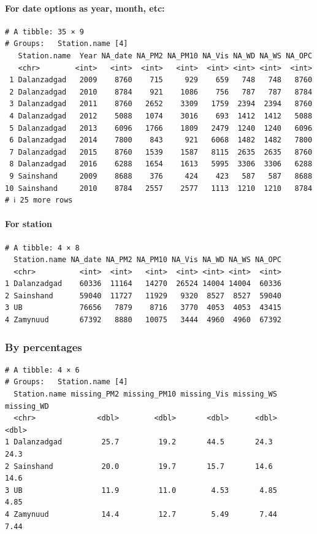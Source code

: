 \documentclass[
]{agujournal2019}
\let\oldparagraph\paragraph
\renewcommand{\paragraph}[1]{\oldparagraph{#1}\mbox{}}
\begin{document}
\paragraph{For date options as year, month,
etc:}\label{for-date-options-as-year-month-etc}

\begin{verbatim}
# A tibble: 35 × 9
# Groups:   Station.name [4]
   Station.name  Year NA_date NA_PM2 NA_PM10 NA_Vis NA_WD NA_WS NA_OPC
   <chr>        <int>   <int>  <int>   <int>  <int> <int> <int>  <int>
 1 Dalanzadgad   2009    8760    715     929    659   748   748   8760
 2 Dalanzadgad   2010    8784    921    1086    756   787   787   8784
 3 Dalanzadgad   2011    8760   2652    3309   1759  2394  2394   8760
 4 Dalanzadgad   2012    5088   1074    3016    693  1412  1412   5088
 5 Dalanzadgad   2013    6096   1766    1809   2479  1240  1240   6096
 6 Dalanzadgad   2014    7800    843     921   6068  1482  1482   7800
 7 Dalanzadgad   2015    8760   1539    1587   8115  2635  2635   8760
 8 Dalanzadgad   2016    6288   1654    1613   5995  3306  3306   6288
 9 Sainshand     2009    8688    376     424    423   587   587   8688
10 Sainshand     2010    8784   2557    2577   1113  1210  1210   8784
# ℹ 25 more rows
\end{verbatim}

\paragraph{For station}\label{for-station}

\begin{verbatim}
# A tibble: 4 × 8
  Station.name NA_date NA_PM2 NA_PM10 NA_Vis NA_WD NA_WS NA_OPC
  <chr>          <int>  <int>   <int>  <int> <int> <int>  <int>
1 Dalanzadgad    60336  11164   14270  26524 14004 14004  60336
2 Sainshand      59040  11727   11929   9320  8527  8527  59040
3 UB             76656   7879    8716   3770  4053  4053  43415
4 Zamynuud       67392   8880   10075   3444  4960  4960  67392
\end{verbatim}

\subsubsection{By percentages}\label{by-percentages}

\begin{verbatim}
# A tibble: 4 × 6
# Groups:   Station.name [4]
  Station.name missing_PM2 missing_PM10 missing_Vis missing_WS missing_WD
  <chr>              <dbl>        <dbl>       <dbl>      <dbl>      <dbl>
1 Dalanzadgad         25.7         19.2       44.5       24.3       24.3 
2 Sainshand           20.0         19.7       15.7       14.6       14.6 
3 UB                  11.9         11.0        4.53       4.85       4.85
4 Zamynuud            14.4         12.7        5.49       7.44       7.44
\end{verbatim}
\end{document}
